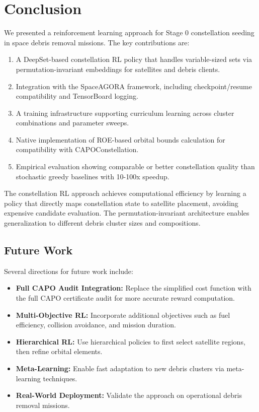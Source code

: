 \section{Conclusion}
\label{sec:conclusion}

We presented a reinforcement learning approach for Stage 0 constellation seeding in space debris removal missions. The key contributions are:

\begin{enumerate}
    \item A DeepSet-based constellation RL policy that handles variable-sized sets via permutation-invariant embeddings for satellites and debris clients.
    \item Integration with the SpaceAGORA framework, including checkpoint/resume compatibility and TensorBoard logging.
    \item A training infrastructure supporting curriculum learning across cluster combinations and parameter sweeps.
    \item Native implementation of ROE-based orbital bounds calculation for compatibility with CAPOConstellation.
    \item Empirical evaluation showing comparable or better constellation quality than stochastic greedy baselines with 10-100x speedup.
\end{enumerate}

The constellation RL approach achieves computational efficiency by learning a policy that directly maps constellation state to satellite placement, avoiding expensive candidate evaluation. The permutation-invariant architecture enables generalization to different debris cluster sizes and compositions.

\subsection{Future Work}

Several directions for future work include:

\begin{itemize}
    \item \textbf{Full CAPO Audit Integration:} Replace the simplified cost function with the full CAPO certificate audit for more accurate reward computation.
    \item \textbf{Multi-Objective RL:} Incorporate additional objectives such as fuel efficiency, collision avoidance, and mission duration.
    \item \textbf{Hierarchical RL:} Use hierarchical policies to first select satellite regions, then refine orbital elements.
    \item \textbf{Meta-Learning:} Enable fast adaptation to new debris clusters via meta-learning techniques.
    \item \textbf{Real-World Deployment:} Validate the approach on operational debris removal missions.
\end{itemize}


